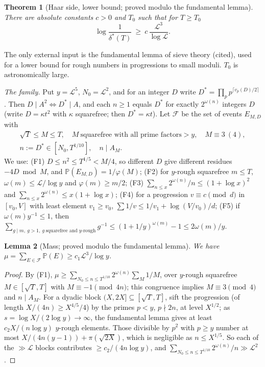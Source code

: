 \documentclass[11pt,reqno]{amsart}
\newtheorem{theorem}{Theorem}[section]
\newtheorem{lemma}[theorem]{Lemma}
\theoremstyle{definition}
\newcommand{\Lc}{\mathcal L}
\newcommand{\PP}{\mathbb P}
\begin{document}
\begin{theorem}[Haar side, lower bound; proved modulo the fundamental lemma]\label{thm:haarlower}
There are absolute constants $c>0$ and $T_0$ such that for $T\ge T_0$
\[
 \log\frac1{\delta^*(T)}\ \ge\ c\,\frac{\Lc^3}{\log\Lc} .
\]
\end{theorem}

The only external input is the fundamental lemma of sieve theory
\cite[Lemma~6.3, Cor.~6.10]{FI} (cited), used for a lower bound for rough numbers in
progressions to small moduli.  $T_0$ is astronomically large.

\emph{The family.}  Put $y=\Lc^5$, $N_0=\Lc^2$, and for an integer $D$ write
$D^*=\prod_pp^{\lceil v_p(D)/2\rceil}$.  Then $D\mid A^2\iff D^*\mid A$, and each
$n\ge1$ equals $D^*$ for exactly $2^{\omega(n)}$ integers $D$ (write $D=\kappa t^2$
with $\kappa$ squarefree; then $D^*=\kappa t$).  Let $\mathcal F$ be the set of
events $E_{M,D}$ with
\begin{multline*}
 \sqrt T\le M\le T,\quad M\ \text{squarefree with all prime factors}>y,\quad M\equiv3\ (4),\\
 n:=D^*\in[N_0,T^{1/10}],\quad n\mid A_M .
\end{multline*}
We use: (F1) $D\le n^2\le T^{1/5}<M/4$, so different $D$ give different
residues $-4D\bmod M$, and $\PP(E_{M,D})=1/\varphi(M)$; (F2) for $y$-rough squarefree
$m\le T$, $\omega(m)\le\Lc/\log y$ and $\varphi(m)\ge m/2$; (F3)
$\sum_{n\le x}2^{\omega(n)}/n\le(1+\log x)^2$ and $\sum_{n\le x}2^{\omega(n)}\le x(1+\log x)$;
(F4) for a progression $v\equiv c\pmod d$ in $[v_0,V]$ with least element
$v_1\ge v_0$, $\sum1/v\le1/v_1+\log(V/v_0)/d$; (F5) if $\omega(m)y^{-1}\le1$, then
$\sum_{g\mid m,\ g>1,\ g\ \text{squarefree and } y\text{-rough}}g^{-1}\le(1+1/y)^{\omega(m)}-1\le2\omega(m)/y$.

\begin{lemma}[Mass; proved modulo the fundamental lemma]\label{lem:hmass}
We have $\mu=\sum_{E\in\mathcal F}\PP(E)\ge c_1\Lc^3/\log y$.
\end{lemma}

\begin{proof}
By (F1), $\mu\ge\sum_{N_0\le n\le T^{1/10}}2^{\omega(n)}\sum_M1/M$, over $y$-rough squarefree
$M\in[\sqrt T,T]$ with $M\equiv-1\pmod{4n}$; this congruence implies $M\equiv3\pmod4$
and $n\mid A_M$.  For a dyadic block $(X,2X]\subseteq[\sqrt T,T]$, sift the
progression (of length $X/(4n)\ge X^{4/5}/4$) by the primes $p<y$, $p\nmid2n$,
at level $X^{1/2}$; as $s=\log X/(2\log y)\to\infty$, the fundamental lemma gives at
least $c_2X/(n\log y)$ $y$-rough elements.  Those divisible by $p^2$ with $p\ge y$
number at most $X/(4n(y-1))+\pi(\sqrt{2X})$, which is negligible as $n\le X^{1/5}$.  So each
of the $\gg\Lc$ blocks contributes $\ge c_2/(4n\log y)$, and
$\sum_{N_0\le n\le T^{1/10}}2^{\omega(n)}/n\gg\Lc^2$.
\end{proof}
\end{document}
